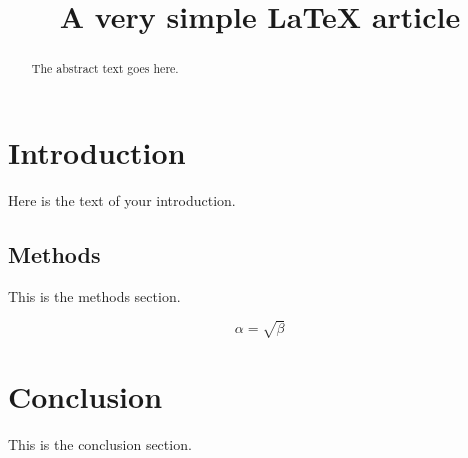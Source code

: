 \documentclass{article}
\begin{document}
\title{A very simple \LaTeX{} article}

\maketitle

\begin{abstract}
The abstract text goes here.
\end{abstract}

\section{Introduction}
Here is the text of your introduction.

\subsection{Methods}
This is the methods section.

\begin{equation}
    \label{simple_equation}
    \alpha = \sqrt{ \beta }
\end{equation}

\section{Conclusion}
This is the conclusion section.
\end{document}
